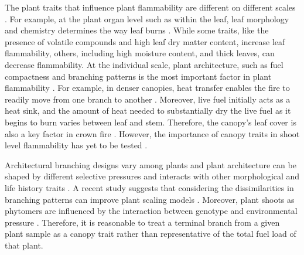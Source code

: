 \documentclass{ttuthes2007}
\begin{document}
\noindent The plant traits that influence plant flammability are different on different scales \citep{pausas2017flammability}. For example, at the plant organ level such as within  the leaf, leaf morphology and chemistry determines the way leaf burns \citep{anderson1970forest, owens1998seasonal, schwilk2011scaling, pausas2016secondary, guerrero2021leaf, ganteaume2021volatile,alam2020shoot}. While some traits, like the presence of volatile compounds and high leaf dry matter content, increase leaf flammability, others, including high moisture content, and thick leaves, can decrease flammability. At the individual scale, plant architecture, such as fuel compactness and branching patterns is %
the most important factor in plant flammability \citep{schwilk2003flammability, madrigal2012evaluation}. For example, in denser canopies, heat transfer enables the fire to readily move from one branch to another \citep{bond1996fire}. Moreover, live fuel initially acts as a heat sink, and the amount of heat needed to substantially dry the live fuel as it begins to burn varies between %
leaf and stem. Therefore, the canopy's leaf cover is  also a key factor in crown fire \citep{ray2005micrometeorological}. However, the importance of canopy traits in shoot level flammability has yet to be tested \citep{alam2020shoot}.



\noindent Architectural branching designs vary among plants \citep{halle2012tropical} and plant architecture can be shaped by different selective pressures \citep{danell1994browseeffects, schwilk2003flammability} and interacts with other morphological and life history traits \citep{ackerly1998leaf, schwilk2001flammability,archibald2003growing}. A recent study suggests that considering the dissimilarities in branching patterns can improve plant scaling models \citep{bentley2013empirical}. Moreover, plant shoots as phytomers are influenced by the interaction between genotype and environmental pressure \citep{mcsteen2005shoot, wang2008molecular}. Therefore, it is reasonable to treat a terminal branch from a given plant sample as a canopy trait rather than representative of the total fuel load of that plant.

\end{document}
